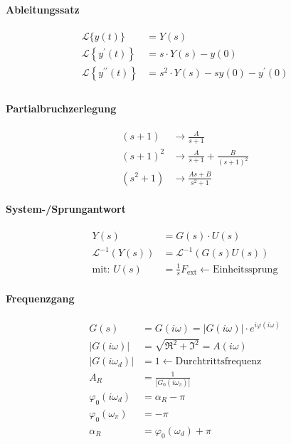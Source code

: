 \documentclass{article}
\begin{document}
\begin{landscape}
\begin{multicols}{2}
\begin{multicols}{2}
\begin{multicols}{2}
\paragraph*{Ableitungssatz}
\begin{align*}
	\mathcal{L}\{y(t)\} &=Y(s) \\
	\mathcal{L}\left\{y^{\prime}(t)\right\} &=s \cdot Y(s)-y(0)  \\
	\mathcal{L}\left\{y^{\prime \prime}(t)\right\}&=s^{2} \cdot Y(s)-s y(0)-y^{\prime}(0) \\
\end{align*}

\paragraph*{Partialbruchzerlegung}
\begin{align*}
	(s+1) &\rightarrow \frac{A}{s+1} \\ 
	(s+1)^2 &\rightarrow \frac{A}{s+1} + \frac{B}{(s+1)^2} \\
	(s^2+1) &\rightarrow \frac{As+B}{s^2+1}
\end{align*}

\paragraph{System-/Sprungantwort}
	\begin{align*}
		Y(s) & =G(s) \cdot U(s) \\
		\mathcal{L}^{-1}(Y(s)) &= \mathcal{L}^{-1}(G(s)U(s)) \\
		\text{mit: } U(s) &= \frac{1}{s}F_{\text{ext}} \leftarrow \text{Einheitssprung} 
	\end{align*}
\paragraph{Frequenzgang}
	\begin{align*}
		G(s) & =G(i\omega) = |G(i\omega)| \cdot e^{i\varphi(i\omega)} \\
		|G(i\omega)| &= \sqrt{\Re^2 + \Im^2} = A(i\omega)\\
		|G(i\omega_d)| &=1 \leftarrow \text{Durchtrittsfrequenz} \\
		A_R &= \frac{1}{|G_0(i\omega_\pi)|} \\
		\varphi_0(i\omega_d) &= \alpha_R - \pi \\
		\varphi_0(\omega_\pi) &= -\pi \\
		\alpha_R &= \varphi_0(\omega_d)+\pi \\
	\end{align*}



\end{multicols}
\end{multicols}
\end{multicols}
\end{landscape}
\end{document}
